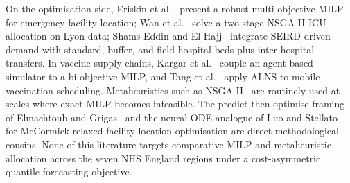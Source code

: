 On the optimisation side, Eriskin et al.~\cite{eriskin2022robust}
present a robust multi-objective MILP for emergency-facility location;
Wan et al.~\cite{wan2023two} solve a two-stage NSGA-II ICU allocation
on Lyon data; Shams Eddin and El Hajj~\cite{shamseddin2025optimization}
integrate SEIRD-driven demand with standard, buffer, and field-hospital
beds plus inter-hospital transfers. In vaccine supply chains,
Kargar et al.~\cite{kargar2024data} couple an agent-based simulator to
a bi-objective MILP, and Tang et al.~\cite{tang2025mobile} apply ALNS
to mobile-vaccination scheduling. Metaheuristics such as
NSGA-II~\cite{deb2002fast} are routinely used at scales where exact
MILP becomes infeasible. The predict-then-optimise framing of
Elmachtoub and Grigas~\cite{elmachtoub2022smart} and the neural-ODE
analogue of Luo and Stellato~\cite{luo2024equitable} for
McCormick-relaxed facility-location optimisation are direct
methodological cousins. None of this literature targets comparative
MILP-and-metaheuristic allocation across the seven NHS England regions
under a cost-asymmetric quantile forecasting objective.
